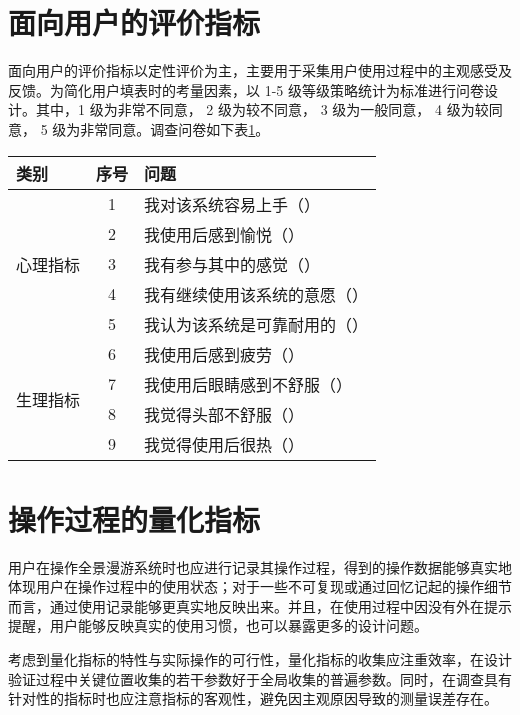 \section{面向用户的评价指标}
面向用户的评价指标以定性评价为主，主要用于采集用户使用过程中的主观感受及反馈。为简化用户填表时的考量因素，以 1-5 级等级策略统计为标准进行问卷设计。其中，1 级为非常不同意， 2 级为较不同意， 3 级为一般同意， 4 级为较同意， 5 级为非常同意。调查问卷如下表\ref{tab:questionnaire}。

\begin{table}[htp]
\centering
{}
\vskip 5pt
\begin{tabular}{lcl}
\toprule
类别 & 序号 & 问题 \\
\midrule
\multirow{5}{*}{心理指标} & 1 & 我对该系统容易上手（\enskip） \\
& 2 & 我使用后感到愉悦（\enskip） \\
& 3 & 我有参与其中的感觉（\enskip） \\
& 4 & 我有继续使用该系统的意愿（\enskip） \\
& 5 & 我认为该系统是可靠耐用的（\enskip） \\
\midrule
\multirow{4}{*}{生理指标} & 6 & 我使用后感到疲劳（\enskip） \\
& 7 & 我使用后眼睛感到不舒服（\enskip） \\
& 8 & 我觉得头部不舒服（\enskip） \\
& 9 & 我觉得使用后很热（\enskip） \\
\bottomrule
\end{tabular}
\label{tab:questionnaire}
\end{table}

\section{操作过程的量化指标}

用户在操作全景漫游系统时也应进行记录其操作过程，得到的操作数据能够真实地体现用户在操作过程中的使用状态；对于一些不可复现或通过回忆记起的操作细节而言，通过使用记录能够更真实地反映出来。并且，在使用过程中因没有外在提示提醒，用户能够反映真实的使用习惯，也可以暴露更多的设计问题。

考虑到量化指标的特性与实际操作的可行性，量化指标的收集应注重效率，在设计验证过程中关键位置收集的若干参数好于全局收集的普遍参数。同时，在调查具有针对性的指标时也应注意指标的客观性，避免因主观原因导致的测量误差存在。

